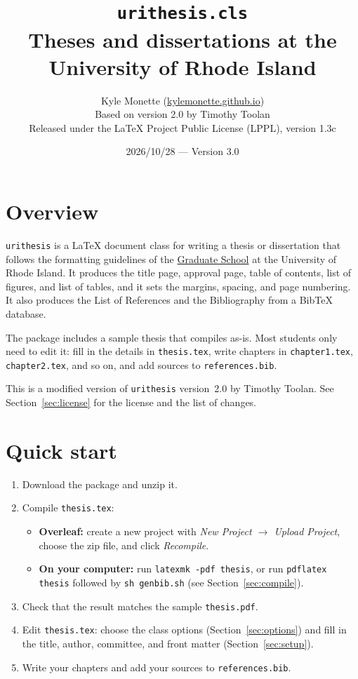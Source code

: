 \documentclass[11pt]{article}
\title{\texttt{urithesis.cls}\\[0.5ex]
  \large Theses and dissertations at the University of Rhode Island}
\author{Kyle Monette (\href{https://kylemonette.github.io}{kylemonette.github.io}) \\
  \small Based on version 2.0 by Timothy Toolan \\
  \small Released under the LaTeX Project Public License (LPPL), version 1.3c}
\date{2026/10/28 --- Version 3.0}
\newcommand\cls{\texttt{urithesis}}
\newcommand\file[1]{\texttt{#1}}
\begin{document}
\maketitle

\section*{Overview}

\cls{} is a \LaTeX{} document class for writing a thesis or dissertation that
follows the formatting guidelines of the
\href{https://web.uri.edu/graduate-school/academics/thesis-dissertation/formatting/}{Graduate School}
at the University of Rhode Island.
It produces the title page, approval page, table of contents, list of figures,
and list of tables, and it sets the margins, spacing, and page numbering.
It also produces the List of References and the Bibliography from a Bib\TeX{}
database.

The package includes a sample thesis that compiles as-is.
Most students only need to edit it: fill in the details in \file{thesis.tex},
write chapters in \file{chapter1.tex}, \file{chapter2.tex}, and so on, and add
sources to \file{references.bib}.

This is a modified version of \cls{} version~2.0 by Timothy Toolan.
See Section~\ref{sec:license} for the license and the list of changes.

\tableofcontents

\section{Quick start}

\begin{enumerate}
\item Download the package and unzip it.
\item Compile \file{thesis.tex}:
  \begin{itemize}
  \item \textbf{Overleaf:} create a new project with \emph{New Project
    $\to$ Upload Project}, choose the zip file, and click \emph{Recompile}.
  \item \textbf{On your computer:} run \verb|latexmk -pdf thesis|, or run
    \verb|pdflatex thesis| followed by \verb|sh genbib.sh|
    (see Section~\ref{sec:compile}).
  \end{itemize}
\item Check that the result matches the sample \file{thesis.pdf}.
\item Edit \file{thesis.tex}: choose the class options
  (Section~\ref{sec:options}) and fill in the title, author, committee, and
  front matter (Section~\ref{sec:setup}).
\item Write your chapters and add your sources to \file{references.bib}.
\end{enumerate}
\end{document}
